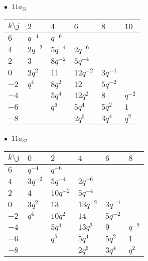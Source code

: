 \begin{minipage}{\linewidth}
$\bullet\ $ $11a_{31}$ \vspace{0.5em} \\
\begin{tabular}{l|lllll}
$k \setminus j$ & $2$ & $4$ & $6$ & $8$ & $10$ \\
\hline
$6$ & $q^{-4}$ & $q^{-6}$ &  &  &  \\
$4$ & $2q^{-2}$ & $5q^{-4}$ & $2q^{-6}$ &  &  \\
$2$ & $3$ & $8q^{-2}$ & $5q^{-4}$ &  &  \\
$0$ & $2q^{2}$ & $11$ & $12q^{-2}$ & $3q^{-4}$ &  \\
$-2$ & $q^{4}$ & $8q^{2}$ & $12$ & $5q^{-2}$ &  \\
$-4$ &  & $5q^{4}$ & $12q^{2}$ & $8$ & $q^{-2}$ \\
$-6$ &  & $q^{6}$ & $5q^{4}$ & $5q^{2}$ & $1$ \\
$-8$ &  &  & $2q^{6}$ & $3q^{4}$ & $q^{2}$ \\
\end{tabular}
\vspace{2em}
\end{minipage}
%
\begin{minipage}{\linewidth}
$\bullet\ $ $11a_{32}$ \vspace{0.5em} \\
\begin{tabular}{l|lllll}
$k \setminus j$ & $0$ & $2$ & $4$ & $6$ & $8$ \\
\hline
$6$ & $q^{-4}$ & $q^{-6}$ &  &  &  \\
$4$ & $3q^{-2}$ & $5q^{-4}$ & $2q^{-6}$ &  &  \\
$2$ & $4$ & $10q^{-2}$ & $5q^{-4}$ &  &  \\
$0$ & $3q^{2}$ & $13$ & $13q^{-2}$ & $3q^{-4}$ &  \\
$-2$ & $q^{4}$ & $10q^{2}$ & $14$ & $5q^{-2}$ &  \\
$-4$ &  & $5q^{4}$ & $13q^{2}$ & $9$ & $q^{-2}$ \\
$-6$ &  & $q^{6}$ & $5q^{4}$ & $5q^{2}$ & $1$ \\
$-8$ &  &  & $2q^{6}$ & $3q^{4}$ & $q^{2}$ \\
\end{tabular}
\vspace{2em}
\end{minipage}
%
